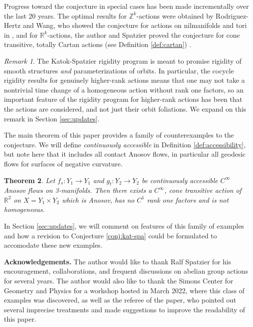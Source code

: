 \documentclass[12pt]{amsart}
\newtheorem{theorem}{Theorem}[section]
\theoremstyle{definition}
\theoremstyle{remark}
\newtheorem{remark}[theorem]{Remark}
\numberwithin{equation}{section}
\newcommand{\Z}{\mathbb{Z}}
\newcommand{\R}{\mathbb{R}}
\newtheorem{Structural Stability Theorem}[theorem]{Structural Stability Theorem}
\begin{document}
Progress toward the conjecture in special cases has been made incrementally over the last 20 years. The optimal results for $\Z^k$-actions were obtained by Rodriguez-Hertz and Wang, who showed the conjecture for actions on nilmanifolds and tori in \cite{RH-W}, and for $\R^k$-actions, the author and Spatzier proved the conjecture for cone transitive, totally Cartan actions (see Definition \ref{def:cartan}) \cite{spatzier-vinhage}.

\begin{remark}
\label{rmk:params-matter}
The Katok-Spatzier rigidity program is meant to promise rigidity of smooth structures {\it and} parameterizations of orbits. In particular, the cocycle rigidity results for genuinely higher-rank actions means that one may not take a nontrivial time change of a homogeneous action without rank one factors, so an important feature of the rigidity program for higher-rank actions has been that the actions are considered, and not just their orbit foliations. We expand on this remark in Section \ref{sec:updates}.
\end{remark}

The main theorem of this paper provides a family of counterexamples to the conjecture. We will define {\it continuously accessible} in Definition \ref{def:accessibility}, but note here that it includes all contact Anosov flows, in particular all geodesic flows for surfaces of negative curvature.

\begin{theorem}
Let $f_s : Y_1 \to Y_1$ and $g_t : Y_2 \to Y_2$ be continuously accessible $C^\infty$ Anosov flows on 3-manifolds. Then there exists a $C^\infty$, cone transitive action of $\R^2$ on $X = Y_1 \times Y_2$ which is Anosov, has no $C^1$ rank one factors and is not homogeneous.
\end{theorem}

In Section \ref{sec:updates}, we will comment on features of this family of examples and how a revision to Conjecture \ref{conj:kat-spa} could be formulated to accomodate these new examples.

\hspace{1cm}

{\noindent \bf Acknowledgements.} The author would like to thank Ralf Spatzier for his encouragement, collaborations, and frequent discussions on abelian group actions for several years. The author would also like to thank the Simons Center for Geometry and Physics for a workshop hosted in March 2022, where this class of examples was discovered, {  as well as the referee of the paper, who pointed out several imprecise treatments and made suggestions to improve the readability of this paper}.
\end{document}
